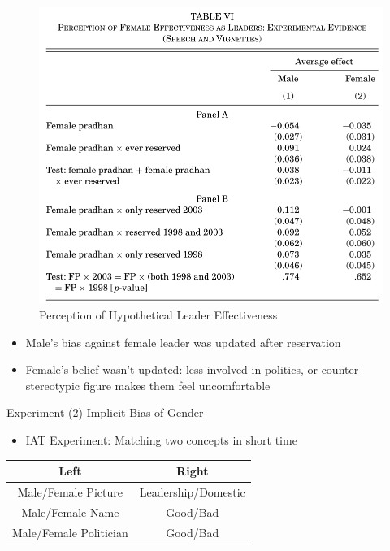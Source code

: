 \documentclass[
  10pt,
  ignorenonframetext,
  aspectratio=43,
]{beamer}
\providecommand{\tightlist}{%
  \setlength{\itemsep}{0pt}\setlength{\parskip}{0pt}}
\begin{document}
\begin{frame}
\begin{figure}
\centering
\includegraphics{20220523-qje-beaman-duflo-powerful-women.assets/table6-hypothetical effectiveness.png}
\caption{Perception of Hypothetical Leader Effectiveness}
\end{figure}

\begin{itemize}
\tightlist
\item
  Male's bias against female leader was updated after reservation
\item
  Female's belief wasn't updated: less involved in politics, or
  counter-stereotypic figure makes them feel uncomfortable
\end{itemize}
\end{frame}

\begin{frame}{Experiment (2) Implicit Bias of Gender}
\protect\hypertarget{experiment-2-implicit-bias-of-gender}{}
\begin{itemize}
\tightlist
\item
  IAT Experiment: Matching two concepts in short time
\end{itemize}

\begin{longtable}[]{@{}cc@{}}
\toprule
Left & Right \\
\midrule
\endhead
Male/Female Picture & Leadership/Domestic \\
Male/Female Name & Good/Bad \\
Male/Female Politician & Good/Bad \\
\bottomrule
\end{longtable}
\end{frame}
\end{document}
